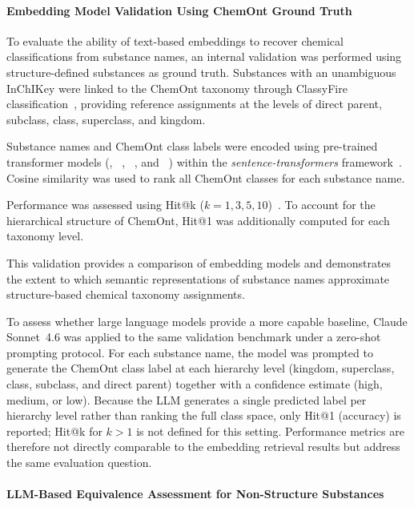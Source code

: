 \paragraph{Embedding Model Validation Using ChemOnt Ground Truth}
\label{sec:chemont_validation}

To evaluate the ability of text-based embeddings to recover chemical classifications from substance names, an internal validation was performed using structure-defined substances as ground truth. Substances with an
unambiguous InChIKey were linked to the ChemOnt taxonomy through ClassyFire classification~\cite{DjoumbouFeunang2016}, providing reference assignments at the levels of direct parent, subclass, class, superclass, and kingdom.

Substance names and ChemOnt class labels were encoded using pre-trained transformer models (, ~\cite{Song2020MPNet}, ~\cite{Beltagy2019SciBERT}, and ~\cite{Lee2020BioBERT}) within the \emph{sentence-transformers} framework~\cite{Reimers2019,Wang2020MiniLM,devlin-etal-2019-bert}. Cosine similarity was used to rank all ChemOnt classes for each substance name.

Performance was assessed using Hit@k ($k = 1, 3, 5, 10$)~\cite{Manning2008}. To account for the hierarchical structure of ChemOnt, Hit@1 was additionally computed for each taxonomy level.

This validation provides a comparison of embedding models and demonstrates the extent to which semantic representations of substance names approximate structure-based chemical taxonomy assignments.

To assess whether large language models provide a more capable baseline, Claude Sonnet~4.6 was applied to the same validation benchmark under a zero-shot prompting protocol. For each substance name, the model was prompted to generate the ChemOnt class label at each hierarchy level (kingdom, superclass, class, subclass, and direct parent) together with a confidence estimate (high, medium, or low). Because the LLM generates a single predicted label per hierarchy level rather than ranking the full class space, only Hit@1 (accuracy) is reported; Hit@k for $k > 1$ is not defined for this setting. Performance metrics are therefore not directly comparable to the embedding retrieval results but address the same evaluation question.

\paragraph{LLM-Based Equivalence Assessment for Non-Structure Substances}


